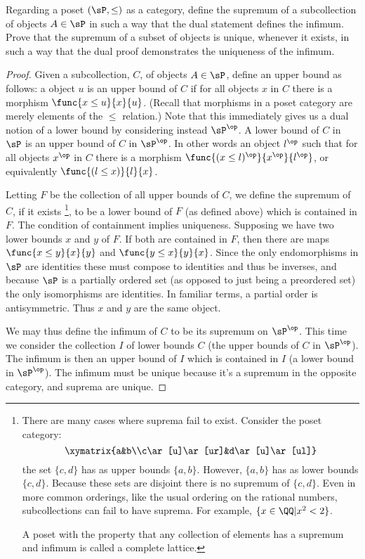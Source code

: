 \documentclass[main.tex]{subfiles}
\begin{document}
\begin{exercise}
	Regarding a poset \((\sP,\le)\) as a category, define the supremum of a
	subcollection of objects \(A\in\sP\) in such a way that the dual
	statement defines the infimum. Prove that the supremum of a subset of
	objects is unique, whenever it exists, in such a way that the dual proof
	demonstrates the uniqueness of the infimum.
\end{exercise}
\begin{proof}
	Given a subcollection, \(C\), of objects \(A\in\sP\), define an upper bound
	as follows: a object \(u\) is an upper bound of \(C\) if for all objects
	\(x\) in \(C\) there is a morphism \(\func{x\le u}{x}{u}\). (Recall that
	morphisms in a poset category are merely elements of the \(\le\) relation.)
	Note that this immediately gives us a dual notion of a lower bound by
	considering instead \(\sP^\op\). A lower bound of \(C\) in \(\sP\) is an
	upper bound of \(C\) in \(\sP^\op\). In other words an object \(l^\op\) such
	that for all objects \(x^\op\) in \(C\) there is a morphism \(\func{(x\le
	l)^\op}{x^\op}{l^\op}\), or equivalently \(\func{(l\le x)}{l}{x}\).

	Letting \(F\) be the collection of all upper bounds of \(C\), we define the
	supremum of \(C\), if it exists%
	\footnote{There are many cases where suprema fail to exist. Consider
		the poset category: \[\xymatrix{a&b\\c\ar[u]\ar[ur]&d\ar[u]\ar[ul]}\]
		the set \(\{c,d\}\) has as upper bounds \(\{a,b\}\). However,
		\(\{a,b\}\) has as lower bounds \(\{c,d\}\). Because these sets are
		disjoint there is no supremum of \(\{c,d\}\). Even in more common
		orderings, like the usual ordering on the rational numbers,
		subcollections can fail to have suprema. For example,
		\(\{x\in\QQ|x^2<2\}\).

		A poset with the property that any collection of elements has a supremum
		and infimum is called a complete lattice.
	}, to be a lower bound of \(F\) (as defined
	above) which is contained in \(F\). The condition of containment implies
	uniqueness. Supposing we have two lower bounds \(x\) and \(y\) of \(F\). If
	both are contained in \(F\), then there are maps \(\func{x\le y}{x}{y}\) and
	\(\func{y\le x}{y}{x}\). Since the only endomorphisms in \(\sP\) are
	identities these must compose to identities and thus be inverses, and
	because \(\sP\) is a partially ordered set (as opposed to just being a
	preordered set) the only isomorphisms are identities. In familiar terms, a
	partial order is antisymmetric. Thus \(x\) and \(y\) are the same object.

	We may thus define the infimum of \(C\) to be its supremum on \(\sP^\op\).
	This time we consider the collection \(I\) of lower bounds \(C\) (the upper
	bounds of \(C\) in \(\sP^\op\)). The infimum is then an upper bound of \(I\)
	which is contained in \(I\) (a lower bound in \(\sP^\op\)). The infimum must
	be unique because it's a supremum in the opposite category, and suprema are
	unique.
\end{proof}
\end{document}
